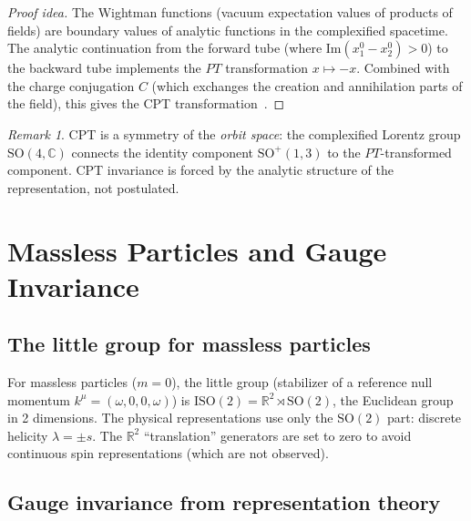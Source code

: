 \documentclass[12pt]{article}
\theoremstyle{plain}
\theoremstyle{definition}
\theoremstyle{remark}
\newtheorem{remark}[theorem]{Remark}
\newcommand{\SO}{\mathrm{SO}}
\newcommand{\ISO}{\mathrm{ISO}}
\begin{document}
\begin{proof}[Proof idea]
The Wightman functions (vacuum expectation values of products of fields) are boundary values of analytic functions in the complexified spacetime. The analytic continuation from the forward tube (where $\mathrm{Im}(x_1^0 - x_2^0) > 0$) to the backward tube implements the $PT$ transformation $x \mapsto -x$. Combined with the charge conjugation $C$ (which exchanges the creation and annihilation parts of the field), this gives the CPT transformation~\cite{jost1957,streater1964}.
\end{proof}

\begin{remark}
CPT is a symmetry of the \emph{orbit space}: the complexified Lorentz group $\SO(4, \mathbb{C})$ connects the identity component $\SO^+(1,3)$ to the $PT$-transformed component. CPT invariance is forced by the analytic structure of the representation, not postulated.
\end{remark}


\section{Massless Particles and Gauge Invariance}
\label{sec:gauge}

\subsection{The little group for massless particles}

For massless particles ($m = 0$), the little group (stabilizer of a reference null momentum $k^\mu = (\omega, 0, 0, \omega)$) is $\ISO(2) = \mathbb{R}^2 \rtimes \SO(2)$, the Euclidean group in 2 dimensions. The physical representations use only the $\SO(2)$ part: discrete helicity $\lambda = \pm s$. The $\mathbb{R}^2$ ``translation'' generators are set to zero to avoid continuous spin representations (which are not observed).

\subsection{Gauge invariance from representation theory}
\end{document}
